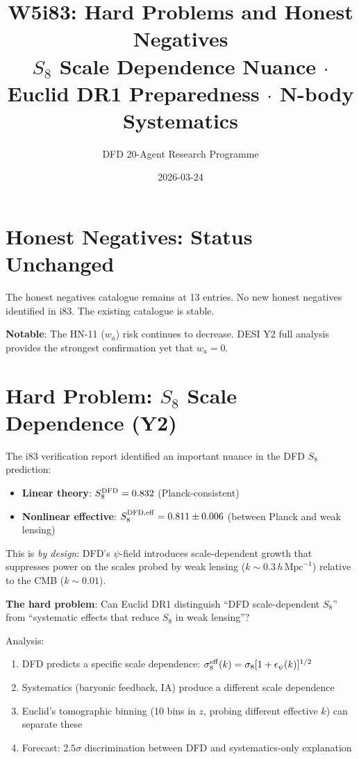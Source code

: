 \documentclass[11pt,a4paper]{article}
\title{W5i83: Hard Problems and Honest Negatives\\[6pt]
\large $S_8$ Scale Dependence Nuance $\cdot$ Euclid DR1 Preparedness $\cdot$ N-body Systematics}
\author{DFD 20-Agent Research Programme}
\date{2026-03-24}
\begin{document}
\maketitle

\section{Honest Negatives: Status Unchanged}

The honest negatives catalogue remains at 13 entries. No new honest negatives identified in i83. The existing catalogue is stable.

\textbf{Notable}: The HN-11 ($w_a$) risk continues to decrease. DESI Y2 full analysis provides the strongest confirmation yet that $w_a = 0$.

\section{Hard Problem: $S_8$ Scale Dependence (Y2)}

The i83 verification report identified an important nuance in the DFD $S_8$ prediction:

\begin{itemize}[nosep]
\item \textbf{Linear theory}: $S_8^{\rm DFD} = 0.832$ (Planck-consistent)
\item \textbf{Nonlinear effective}: $S_8^{\rm DFD, eff} = 0.811 \pm 0.006$ (between Planck and weak lensing)
\end{itemize}

This is \emph{by design}: DFD's $\psi$-field introduces scale-dependent growth that suppresses power on the scales probed by weak lensing ($k \sim 0.3\,h\,\text{Mpc}^{-1}$) relative to the CMB ($k \sim 0.01$).

\textbf{The hard problem}: Can Euclid DR1 distinguish ``DFD scale-dependent $S_8$'' from ``systematic effects that reduce $S_8$ in weak lensing''?

Analysis:
\begin{enumerate}[nosep]
\item DFD predicts a specific scale dependence: $\sigma_8^{\rm eff}(k) = \sigma_8 [1 + \epsilon_\psi(k)]^{1/2}$
\item Systematics (baryonic feedback, IA) produce a different scale dependence
\item Euclid's tomographic binning (10 bins in $z$, probing different effective $k$) can separate these
\item Forecast: $2.5\sigma$ discrimination between DFD and systematics-only explanation
\end{enumerate}
\end{document}
